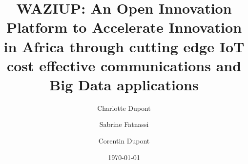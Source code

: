 \documentclass{llncs}
\begin{document}
\title{WAZIUP: An Open Innovation Platform to Accelerate Innovation in Africa through cutting edge IoT cost effective communications and Big Data applications}

\author{Charlotte Dupont \and Sabrine Fatnassi \and Corentin Dupont}

\date{\today}

\maketitle

\begin{abstract}

\end{abstract}










\end{document}
